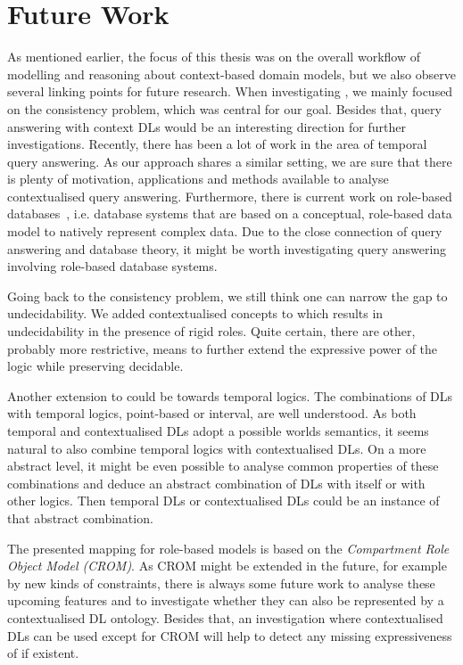 \section{Future Work}
\label{sec:future-work}

As mentioned earlier, the focus of this thesis was on the overall workflow of modelling and
reasoning about context-based domain models, but we also observe several linking points for future
research. When investigating \LMLO, we mainly focused on the consistency problem, which was central
for our goal. Besides that, query answering with context DLs would be an interesting direction for
further investigations. Recently, there has been a lot of work in the area of temporal query
answering. As our approach shares a similar setting, we are sure that there is plenty of motivation,
applications and methods available to analyse contextualised query answering. Furthermore, there is
current work on role-based databases~\cite{JaKV-ADBIS16}, i.e. database systems that are based on a
conceptual, role-based data model to natively represent complex data. Due to the close connection of
query answering and database theory, it might be worth investigating query answering involving
role-based database systems.

Going back to the consistency problem, we still think one can narrow the gap to undecidability. We
added contextualised concepts to \LMLO which results in undecidability in the presence of rigid
roles. Quite certain, there are other, probably more restrictive, means to further extend the
expressive power of the logic while preserving decidable.

Another extension to \LMLO could be towards temporal logics. The combinations of DLs with
temporal logics, point-based or interval, are well understood. As both temporal and contextualised DLs
adopt a possible worlds semantics, it seems natural to also combine temporal logics with contextualised
DLs. On a more abstract level, it might be even possible to analyse common properties of these
combinations and deduce an abstract combination of DLs with itself or with other logics. Then
temporal DLs or contextualised DLs could be an instance of that abstract combination.

The presented mapping for role-based models is based on the \emph{Compartment Role Object Model
  (CROM)}. As CROM might be extended in the future, for example by new kinds of constraints,
there is always some future work to analyse these upcoming features and to investigate whether they can
also be represented by a contextualised DL ontology.  Besides that, an investigation where contextualised
DLs can be used except for CROM will help to detect any missing expressiveness of \LMLO if existent.

